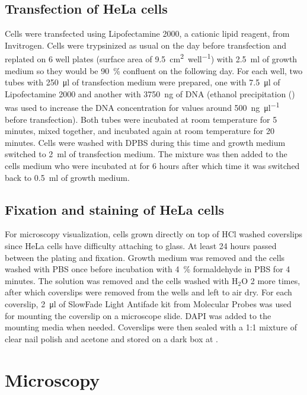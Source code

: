   \subsection{Transfection of HeLa cells}
    Cells were transfected using Lipofectamine 2000, a cationic lipid reagent, from
    Invitrogen. Cells were trypsinized as usual on the day before transfection and
    replated on 6 well plates (surface area of \SI{9.5}{\square\cm\per well}) with \SI{2.5}{\ml} of growth
    medium so they would be \SI{90}{\percent} confluent on the following day. For each well,
    two tubes with \SI{250}{\ul} of transfection medium were prepared, one with \SI{7.5}{\ul}
    of Lipofectamine 2000 and another with \SI{3750}{\ng} of DNA (ethanol precipitation
    () was used to increase the DNA concentration for values around \SI{500}{\ng\per\ul}
    before transfection). Both tubes were incubated at room temperature for 5 minutes,
    mixed together, and incubated again at room temperature for 20 minutes. Cells
    were washed with DPBS during this time and growth medium switched to \SI{2}{\ml}
    of transfection medium. The mixture was then added to the cells medium who
    were incubated at  for 6 hours after which time it was switched back to
    \SI{0.5}{\ml} of growth medium.

  \subsection{Fixation and staining of HeLa cells}
    For microscopy visualization, cells grown directly on top of HCl washed coverslips since
    HeLa cells have difficulty attaching to glass. At least 24 hours passed
    between the plating and fixation. Growth medium was removed and the cells
    washed with PBS once before incubation with \SI{4}{\percent} formaldehyde in PBS
    for 4 minutes. The solution was removed and the cells washed with H$_2$O 2 more
    times, after which coverslips were removed from the wells and left to air dry.
    For each coverslip, \SI{2}{\ul} of SlowFade Light Antifade kit from Molecular Probes
    was used for mounting the coverslip on a microscope slide. DAPI was added
    to the mounting media when needed. Coverslips were then sealed with a 1:1
    mixture of clear nail polish and acetone and stored on a dark box at .


\section{Microscopy}
